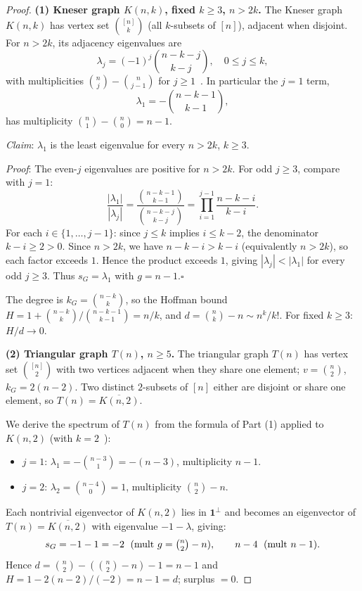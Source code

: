 \begin{proof}
\textbf{(1) Kneser graph $K(n,k)$, fixed $k\ge 3$, $n > 2k$.}
The Kneser graph $K(n,k)$ has vertex set $\binom{[n]}{k}$ (all $k$-subsets of $[n]$), adjacent when disjoint.  For $n > 2k$, its adjacency eigenvalues are
\[
  \lambda_j = (-1)^j\binom{n-k-j}{k-j},\quad 0\le j\le k,
\]
with multiplicities $\binom{n}{j}-\binom{n}{j-1}$ for $j\ge 1$~\cite{BvM2022}.  In particular the $j=1$ term,
\[
  \lambda_1 = -\binom{n-k-1}{k-1},
\]
has multiplicity $\binom{n}{1}-\binom{n}{0} = n-1$.

\textit{Claim}: $\lambda_1$ is the least eigenvalue for every $n > 2k$, $k\ge 3$.

\textit{Proof}: The even-$j$ eigenvalues are positive for $n>2k$.  For odd $j\ge 3$, compare with $j=1$:
\[
  \frac{|\lambda_1|}{|\lambda_j|}
  = \frac{\binom{n-k-1}{k-1}}{\binom{n-k-j}{k-j}}
  = \prod_{i=1}^{j-1}\frac{n-k-i}{k-i}.
\]
For each $i\in\{1,\ldots,j-1\}$: since $j\le k$ implies $i\le k-2$, the denominator $k-i\ge 2 > 0$.  Since $n>2k$, we have $n-k-i > k-i$ (equivalently $n>2k$), so each factor exceeds $1$.  Hence the product exceeds $1$, giving $|\lambda_j| < |\lambda_1|$ for every odd $j\ge 3$.  Thus $s_G = \lambda_1$ with $g = n-1$.\hfill$\square$

The degree is $k_G = \binom{n-k}{k}$, so the Hoffman bound
$H = 1 + \binom{n-k}{k}/\binom{n-k-1}{k-1} = n/k$,
and $d = \binom{n}{k}-n\sim n^k/k!$.  For fixed $k\ge 3$: $H/d \to 0$.

\textbf{(2) Triangular graph $T(n)$, $n\ge 5$.}
The triangular graph $T(n)$ has vertex set $\binom{[n]}{2}$ with two vertices adjacent when they share one element; $v=\binom{n}{2}$, $k_G=2(n-2)$.  Two distinct $2$-subsets of $[n]$ either are disjoint or share one element, so $T(n) = \overline{K(n,2)}$.

We derive the spectrum of $T(n)$ from the formula of Part (1) applied to $K(n,2)$ (with $k=2$~\cite{BvM2022}):
\begin{itemize}
  \item $j=1$: $\lambda_1 = -\binom{n-3}{1} = -(n-3)$, multiplicity $n-1$.
  \item $j=2$: $\lambda_2 = \binom{n-4}{0} = 1$, multiplicity $\binom{n}{2}-n$.
\end{itemize}
Each nontrivial eigenvector of $K(n,2)$ lies in $\mathbf{1}^\perp$ and becomes an eigenvector of $T(n)=\overline{K(n,2)}$ with eigenvalue $-1-\lambda$, giving:
\[
  s_G = -1-1 = -2\;\text{ (mult }g=\tbinom{n}{2}-n\text{)},
  \qquad
  n-4\;\text{ (mult }n-1\text{)}.
\]
Hence $d = \binom{n}{2}-(\binom{n}{2}-n)-1 = n-1$ and $H = 1-2(n-2)/(-2) = n-1 = d$; surplus $= 0$.


\end{proof}
